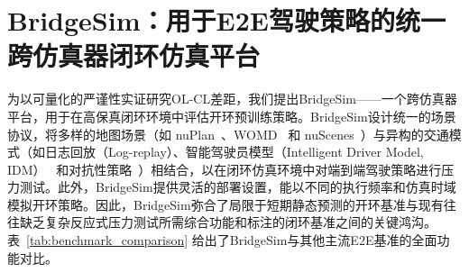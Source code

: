 \documentclass{article}
\begin{document}
\begin{table}[tbh]
\centering
\caption{与其他E2E开环和闭环基准的对比。MV-Consistency：多视图时间一致性，TF-Consistency：交通元素标注一致性。PG：程序化地图与行为生成。关于BridgeSim平台的更多细节见附录~\ref{appendix:bridgesim_platform}。}
\label{tab:benchmark_comparison}
\end{table}

\section{BridgeSim：用于E2E驾驶策略的统一跨仿真器闭环仿真平台}
\label{section:bridgesim_platform}

为以可量化的严谨性实证研究OL-CL差距，我们提出BridgeSim——一个跨仿真器平台，用于在高保真闭环环境中评估开环预训练策略。BridgeSim设计统一的场景协议，将多样的地图场景（如 nuPlan~\cite{caesar2021nuplan}、WOMD~\cite{mei2022waymo} 和 nuScenes~\cite{caesar2020nuscenes}）与异构的交通模式（如日志回放（Log-replay）、智能驾驶员模型（Intelligent Driver Model, IDM）~\cite{idm} 和对抗性策略~\cite{advbmt}）相结合，以在闭环仿真环境中对端到端驾驶策略进行压力测试。此外，BridgeSim提供灵活的部署设置，能以不同的执行频率和仿真时域模拟开环策略。因此，BridgeSim弥合了局限于短期静态预测的开环基准与现有往往缺乏复杂反应式压力测试所需综合功能和标注的闭环基准之间的关键鸿沟。表~\ref{tab:benchmark_comparison} 给出了BridgeSim与其他主流E2E基准的全面功能对比。
\end{document}
